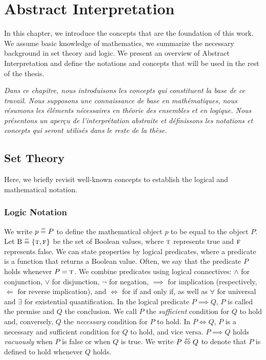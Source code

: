 


\setchapterpreamble[u]{\margintoc}


\chapter{Abstract Interpretation}


\marginemptybox{11.4cm}

In this chapter, we introduce the concepts that are the foundation of this work.
We assume basic knowledge of mathematics, we summarize the necessary background in set theory and logic.
We present an overview of Abstract Interpretation and define the notations and concepts that will be used in the rest of the thesis.

\emph{Dans ce chapitre, nous introduisons les concepts qui constituent la base de ce travail. Nous supposons une connaissance de base en mathématiques, nous résumons les éléments nécessaires en théorie des ensembles et en logique. Nous présentons un aperçu de l'interprétation abstraite et définissons les notations et concepts qui seront utilisés dans le reste de la thèse.}

\section{Set Theory}

Here, we briefly revisit well-known concepts to establish the logical and mathematical notation.

\subsection{Logic Notation}

We write $p \defeq P$ to define the mathematical object $p$ to be equal to the object $P$.
Let $\B \defeq \{\true, \false\}$ be the set of Boolean values, where $\textsc{t}$ represents true and $\textsc{f}$ represents false.
We can state properties by logical predicates, where a predicate is a function that returns a Boolean value.
Often, we say that the predicate $P$ holds whenever $P = \textsc{t}$.
We combine predicates using logical connectives: $\land$ for conjunction, $\lor$ for disjunction, $\neg$ for negation, $\implies$ for implication (respectively, $\Leftarrow$ for reverse implication), and $\iff$ for if and only if, as well as $\forall$ for universal and $\exists$ for existential quantification.
In the logical predicate $P \implies Q$, $P$ is called the premise and $Q$ the conclusion.
We call $P$ the \emph{sufficient} condition for $Q$ to hold and, conversely, $Q$ the \emph{necessary} condition for $P$ to hold.
In $P \iff Q$, $P$ is a necessary and sufficient condition for $Q$ to hold, and vice versa.
$P \implies Q$ holds \emph{vacuously} when $P$ is false or when $Q$ is true.
We write $P \defiff Q$ to denote that $P$ is defined to hold whenever $Q$ holds.

